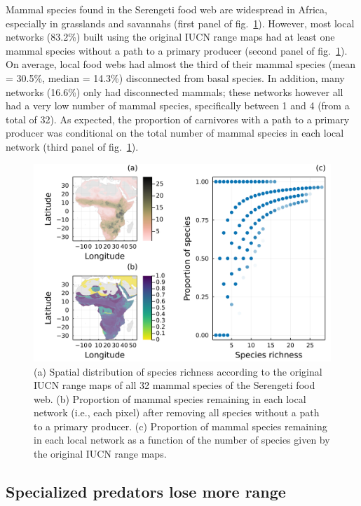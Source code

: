 \documentclass[11pt]{article}
\makeatletter
\def\maxwidth{\ifdim\Gin@nat@width>\linewidth\linewidth
\else\Gin@nat@width\fi}
\let\Oldincludegraphics\includegraphics
\renewcommand{\includegraphics}[1]{\Oldincludegraphics[width=\maxwidth]{#1}}
\makeatother
\begin{document}
Mammal species found in the Serengeti food web are widespread in Africa,
especially in grasslands and savannahs (first panel of
fig.~\ref{fig:richness}). However, most local networks (83.2\%) built
using the original IUCN range maps had at least one mammal species
without a path to a primary producer (second panel of
fig.~\ref{fig:richness}). On average, local food webs had almost the
third of their mammal species (mean = 30.5\%, median = 14.3\%)
disconnected from basal species. In addition, many networks (16.6\%)
only had disconnected mammals; these networks however all had a very low
number of mammal species, specifically between 1 and 4 (from a total of
32). As expected, the proportion of carnivores with a path to a primary
producer was conditional on the total number of mammal species in each
local network (third panel of fig.~\ref{fig:richness}).

\begin{figure}
\hypertarget{fig:richness}{%
\centering
\includegraphics{figures/richness_prop_removed.png}
\caption{(a) Spatial distribution of species richness according to the
original IUCN range maps of all 32 mammal species of the Serengeti food
web. (b) Proportion of mammal species remaining in each local network
(i.e., each pixel) after removing all species without a path to a
primary producer. (c) Proportion of mammal species remaining in each
local network as a function of the number of species given by the
original IUCN range maps.}\label{fig:richness}
}
\end{figure}

\hypertarget{specialized-predators-lose-more-range}{%
\subsection{Specialized predators lose more
range}\label{specialized-predators-lose-more-range}}
\end{document}
